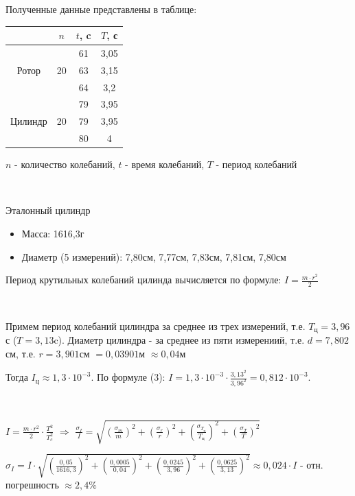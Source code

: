 \documentclass{article}
\begin{document}
\noindent
Полученные данные представлены в таблице:

\begin{table}[h]
    \centering
    \begin{tabular}{|c|c|c|c|}
        \hline
         & $n$ & $t$, c & $T$, с \\
         \hline
               &    & 61 & 3,05 \\
         Ротор & 20 & 63 & 3,15 \\
               &    & 64 & 3,2  \\
         \hline
                 &    & 79 & 3,95 \\
         Цилиндр & 20 & 79 & 3,95 \\
                 &    & 80 & 4    \\
         \hline
    \end{tabular}
\end{table}
$n$ - количество колебаний, $t$ - время колебаний, $T$ - период колебаний

\

\noindent
Эталонный цилиндр
\begin{itemize}
    \item Масса: 1616,3г
    \item Диаметр (5 измерений): 7,80см, 7,77см, 7,83см, 7,81см, 7,80см
\end{itemize}

\noindent
Период крутильных колебаний цилинда вычисляется по формуле: $I = \frac{m\cdot r^2}{2}$

\

\noindent
Примем период колебаний цилиндра за среднее из трех измерений, т.е. $T_\text{ц} = 3,96$с ($T = 3,13$c). Диаметр цилиндра - за среднее из пяти измерениий, т.е. $d = 7,802$см, т.е. $r = 3,901$см $= 0,03901$м $\approx 0,04$м

\noindent
Тогда $I_{\text{ц}} \approx 1,3 \cdot 10^{-3}$. По формуле (3): $I = 1,3 \cdot 10^{-3} \cdot \frac{3,13^2}{3,96^2} = 0,812 \cdot 10^{-3}$.

\

$I=\frac{m\cdot r^2}{2}\cdot\frac{T^2}{T^2_c}$ $\Rightarrow$ $\frac{\sigma_I}{I} = \sqrt{(\frac{\sigma_m}{m})^2 +(\frac{\sigma_r}{r})^2 +(\frac{\sigma_{T_\text{ц}}}{T_\text{ц}})^2 +(\frac{\sigma_T}{T})^2}$

$\sigma_I = I \cdot \sqrt{(\frac{0,05}{1616,3})^2 +(\frac{0,0005}{0,04})^2 +(\frac{0,0245}{3,96})^2 +(\frac{0,0625}{3,13})^2} \approx 0,024 \cdot I$ - отн. погрешность $\approx 2,4\%$
\end{document}
